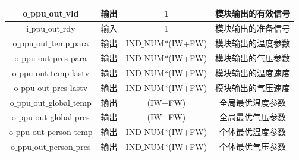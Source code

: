 \begin{table}[H]
\begin{tabular}{c|c|c|c}
        o$\_$ppu$\_$out$\_$vld                         & 输出      & 1                     & 模块输出的有效信号        \\ \hline
        i$\_$ppu$\_$out$\_$rdy                         & 输入      & 1                     & 模块输出的准备信号        \\ \hline
        o$\_$ppu$\_$out$\_$temp$\_$para                & 输出      & IND$\_$NUM*(IW+FW)    & 模块输出的温度参数        \\ \hline
        o$\_$ppu$\_$out$\_$pres$\_$para                & 输出      & IND$\_$NUM*(IW+FW)    & 模块输出的气压参数        \\ \hline
        o$\_$ppu$\_$out$\_$temp$\_$lastv               & 输出      & IND$\_$NUM*(IW+FW)    & 模块输出的温度速度        \\ \hline
        o$\_$ppu$\_$out$\_$pres$\_$lastv               & 输出      & IND$\_$NUM*(IW+FW)    & 模块输出的气压速度        \\ \hline
        o$\_$ppu$\_$out$\_$global$\_$temp              & 输出      & (IW+FW)               & 全局最优温度参数        \\ \hline
        o$\_$ppu$\_$out$\_$global$\_$pres              & 输出      & (IW+FW)               & 全局最优气压参数        \\ \hline
        o$\_$ppu$\_$out$\_$person$\_$temp              & 输出      & IND$\_$NUM*(IW+FW)    & 个体最优温度参数        \\ \hline
        o$\_$ppu$\_$out$\_$person$\_$pres              & 输出      & IND$\_$NUM*(IW+FW)    & 个体最优气压参数        \\ \hline
    \end{tabular}
  \end{table}

